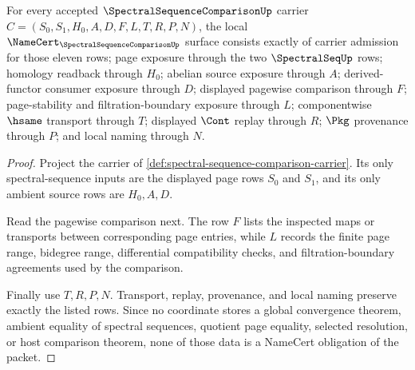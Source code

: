 \begin{theorem}
\label{thm:spectral-sequence-comparison-namecert-obligations}
For every accepted $\SpectralSequenceComparisonUp$ carrier $C=(S_0,S_1,H_0,A,D,F,L,T,R,P,N)$, the local $\NameCert_{\SpectralSequenceComparisonUp}$ surface consists exactly of carrier admission for those eleven rows; page exposure through the two $\SpectralSeqUp$ rows; homology readback through $H_0$; abelian source exposure through $A$; derived-functor consumer exposure through $D$; displayed pagewise comparison through $F$; page-stability and filtration-boundary exposure through $L$; componentwise $\hsame$ transport through $T$; displayed $\Cont$ replay through $R$; $\Pkg$ provenance through $P$; and local naming through $N$.
\end{theorem}
\begin{proof}
Project the carrier of \autoref{def:spectral-sequence-comparison-carrier}. Its only spectral-sequence inputs are the displayed page rows $S_0$ and $S_1$, and its only ambient source rows are $H_0,A,D$.

Read the pagewise comparison next. The row $F$ lists the inspected maps or transports between corresponding page entries, while $L$ records the finite page range, bidegree range, differential compatibility checks, and filtration-boundary agreements used by the comparison.

Finally use $T,R,P,N$. Transport, replay, provenance, and local naming preserve exactly the listed rows. Since no coordinate stores a global convergence theorem, ambient equality of spectral sequences, quotient page equality, selected resolution, or host comparison theorem, none of those data is a NameCert obligation of the packet.
\end{proof}

